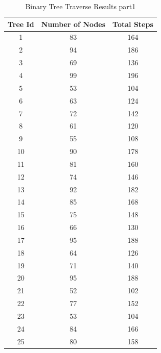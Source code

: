 \documentclass[12p]{article}
\begin{document}
\footnotesize
\begin{table}[ht]
\caption{Binary Tree Traverse Results part1} 					%
\centering 									%
\begin{tabular}{c c c} 							%
\hline\hline 									%
Tree Id & Number of Nodes & Total Steps\\ [0.5ex] 			%
\hline %
1 & 83 & 164 \\ 								%
2 & 94 & 186 \\
3 & 69 & 136 \\
4 & 99 & 196 \\
5 & 53 & 104 \\
6 & 63 & 124 \\
7 & 72 & 142 \\
8 & 61 & 120 \\
9 & 55 & 108 \\
10 & 90 & 178 \\
11 & 81 & 160 \\
12 & 74 & 146 \\
13 & 92 & 182 \\
14 & 85 & 168 \\
15 & 75 & 148 \\
16 & 66 & 130 \\
17 & 95 & 188 \\
18 & 64 & 126 \\
19 & 71 & 140 \\
20 & 95 & 188 \\
21 & 52 & 102 \\
22 & 77 & 152 \\
23 & 53 & 104 \\
24 & 84 & 166 \\
25 & 80 & 158 \\
\hline %
\end{tabular}
\label{table:nonlin} %
\end{table}
\end{document}
